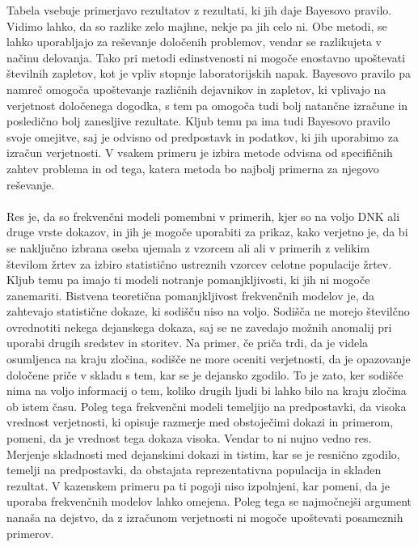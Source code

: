 \documentclass[12pt,a4paper]{amsart}
\theoremstyle{definition} %
\theoremstyle{plain} %
\begin{document}
Tabela vsebuje primerjavo rezultatov z rezultati, ki jih daje Bayesovo pravilo. Vidimo lahko, da so razlike zelo majhne, nekje pa jih celo ni.  Obe metodi, 
se lahko uporabljajo za reševanje določenih problemov, vendar se razlikujeta v načinu delovanja. Tako pri metodi edinstvenosti ni mogoče enostavno 
upoštevati številnih zapletov, kot je vpliv stopnje laboratorijskih napak. Bayesovo pravilo pa namreč omogoča upoštevanje različnih dejavnikov in 
zapletov, ki vplivajo na verjetnost določenega dogodka, s tem pa omogoča tudi bolj natančne izračune in posledično bolj zanesljive rezultate. Kljub 
temu pa ima tudi Bayesovo pravilo svoje omejitve, saj je odvisno od predpostavk in podatkov, ki jih uporabimo za izračun verjetnosti. V vsakem primeru je 
izbira metode odvisna od specifičnih zahtev problema in od tega, katera metoda bo najbolj primerna za njegovo reševanje.\\\\
Res je, da so frekvenčni modeli pomembni v primerih, kjer so na voljo DNK ali druge vrste dokazov, in jih je mogoče uporabiti za prikaz, kako verjetno je, 
da bi se naključno izbrana oseba ujemala z vzorcem ali ali v primerih z velikim številom žrtev za izbiro statistično ustreznih vzorcev celotne populacije 
žrtev. Kljub temu pa imajo ti modeli notranje pomanjkljivosti, ki jih ni mogoče zanemariti. Bistvena teoretična pomanjkljivost frekvenčnih modelov je, 
da zahtevajo statistične dokaze, ki sodišču niso na voljo. Sodišča ne morejo številčno ovrednotiti nekega dejanskega dokaza, saj se ne zavedajo možnih 
anomalij pri uporabi drugih sredstev in storitev. Na primer, če priča trdi, da je videla osumljenca na kraju zločina, sodišče ne more oceniti verjetnosti, 
da je opazovanje določene priče v skladu s tem, kar se je dejansko zgodilo. To je zato, ker sodišče nima na voljo informacij o tem, koliko drugih ljudi 
bi lahko bilo na kraju zločina ob istem času. Poleg tega frekvenčni modeli temeljijo na predpostavki, da visoka vrednost verjetnosti, ki opisuje razmerje 
med obstoječimi dokazi in primerom, pomeni, da je vrednost tega dokaza visoka. Vendar to ni nujno vedno res. Merjenje skladnosti med dejanskimi dokazi 
in tistim, kar se je resnično zgodilo, temelji na predpostavki, da obstajata reprezentativna populacija in skladen rezultat. V kazenskem primeru pa 
ti pogoji niso izpolnjeni, kar pomeni, da je uporaba frekvenčnih modelov lahko omejena. Poleg tega se najmočnejši argument nanaša na dejstvo, da z 
izračunom verjetnosti ni mogoče upoštevati posameznih primerov.

\end{document}
